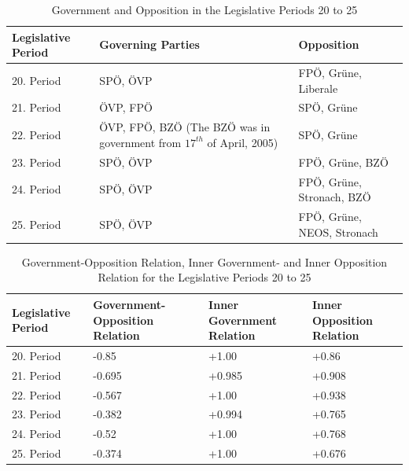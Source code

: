 \begin{table}[h]

\centering
\bgroup
\def\arraystretch{1.2}
\begin{tabular}{| p{2cm} | p{5cm} | l |}
\hline
  Legislative Period & Governing Parties & Opposition  \\
\hline
\hline
  20. Period & SPÖ, ÖVP & FPÖ, Grüne, Liberale \\
\hline
  21. Period & ÖVP, FPÖ & SPÖ, Grüne \\
\hline
  22. Period & ÖVP, FPÖ, BZÖ (The BZÖ was in government from $17^{th}$ of April, 2005) & SPÖ, Grüne \\
\hline
  23. Period & SPÖ, ÖVP & FPÖ, Grüne, BZÖ \\
\hline
  24. Period & SPÖ, ÖVP & FPÖ, Grüne, Stronach, BZÖ \\
\hline
  25. Period & SPÖ, ÖVP & FPÖ, Grüne, NEOS, Stronach \\
\hline

\end{tabular}
\egroup
\caption{Government and Opposition in the Legislative Periods 20 to 25}
\label{table:gov_opp_parties}
\end{table}



\begin{table}[h]

\centering
\bgroup
\def\arraystretch{1.2}
\begin{tabular}{| p{2cm} | p{3cm} | p{3cm} | p{3cm} |}
\hline
  Legislative Period & Government-Opposition Relation & Inner Government Relation & Inner Opposition Relation \\
\hline
\hline
  20. Period & -0.85 & +1.00 & +0.86 \\
\hline
  21. Period & -0.695 & +0.985 & +0.908 \\
\hline
  22. Period & -0.567 & +1.00 & +0.938 \\
\hline
  23. Period & -0.382 & +0.994 & +0.765\\
\hline
  24. Period & -0.52 & +1.00 & +0.768\\
\hline
  25. Period & -0.374 & +1.00 & +0.676\\
\hline

\end{tabular}
\egroup
\caption{Government-Opposition Relation, Inner Government- and Inner Opposition Relation for the Legislative Periods 20 to 25}
\label{table:gov_opp_relation}
\end{table}
